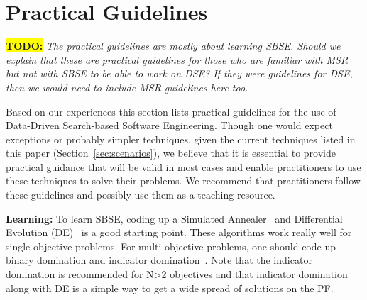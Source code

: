 \documentclass[sigconf,anonymous,review]{acmart}
\newcommand\TODO[1]{\textcolor{ScarletRed}{\textbf{\colorbox{yellow}{\small TODO:}} \emph{#1}}\xspace}
\begin{document}
\section{Practical Guidelines}


\TODO{The practical guidelines are mostly about learning SBSE. Should we explain that these are practical guidelines for those who are familiar with MSR but not with SBSE to be able to work on DSE? If they were guidelines for DSE, then we would need to include MSR guidelines here too.}

Based on our experiences this section lists practical guidelines for the use of Data-Driven Search-based Software Engineering. 
Though one would expect exceptions or probably simpler techniques, given the current techniques listed in this paper (Section~\ref{sec:scenarios}), we believe that it is essential to provide practical guidance that will be valid in most cases and enable practitioners to use these techniques to solve their problems. 
We recommend that practitioners follow these guidelines and possibly use them as a teaching resource.

 
\noindent\textbf{Learning: } To learn SBSE, coding up a Simulated Annealer~\cite{van1987simulated} and Differential Evolution (DE)~\cite{storn97} is a good starting point.  These algorithms work really well for single-objective problems. For multi-objective problems, one should code up binary domination and indicator domination~\cite{zitzler2001spea2}. Note that the indicator domination is recommended for N>2 objectives and that indicator domination along with DE is a simple way to get a wide spread of solutions on the PF. 
\end{document}
